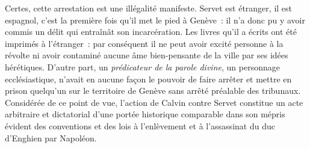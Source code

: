 \documentclass[french,twoside]{book} %
\newcommand{\astermono}{\medskip\centerline{\color{rubric}\large\selectfont{\syms ✻}}\medskip\par}%
\begin{document}
Certes, cette arrestation est une illégalité manifeste. Servet est étranger, il est espagnol, c’est la première fois qu’il met le pied à Genève : il n’a donc pu y avoir commis un délit qui entraînât son incarcération. Les livres qu’il a écrits ont été imprimés à l’étranger : par conséquent il ne peut avoir excité personne à la révolte ni avoir contaminé aucune âme bien-pensante de la ville par ses idées hérétiques. D’autre part, un \emph{prédicateur de la parole divine}, un personnage ecclésiastique, n’avait en aucune façon le pouvoir de faire arrêter et mettre en prison quelqu’un sur le territoire de Genève sans arrêté préalable des tribunaux. Considérée de ce point de vue, l’action de Calvin contre Servet constitue un acte arbitraire et dictatorial d’une portée historique comparable dans son mépris évident des conventions et des lois à l’enlèvement et à l’assassinat du duc d’Enghien par Napoléon.\par

\astermono
\end{document}
